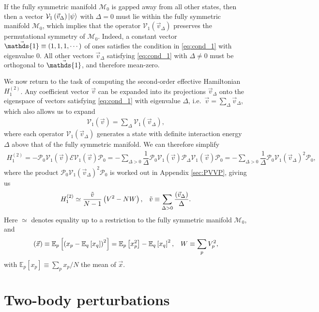 \documentclass[nofootinbib,notitlepage,11pt]{revtex4-2}
\newcommand{\f}[2]{\dfrac{#1}{#2}} %
\newcommand{\p}[1]{\left(#1\right)} %
\renewcommand{\sp}[1]{\left[#1\right]} %
\renewcommand{\v}{\vec} %
\newcommand{\1}{\mathds{1}}
\newcommand{\E}{\mathcal{E}}
\newcommand{\M}{\mathcal{M}}
\renewcommand{\P}{\mathcal{P}}
\newcommand{\V}{\mathcal{V}}
\newcommand{\EE}{\mathbb{E}}
\let\var\relax
\DeclareMathOperator{\var}{var}
\begin{document}
If the fully symmetric manifold $\M_0$ is gapped away from all other
states, then then a vector $\V_1\p{\v v_\Delta}\ket\psi$ with
$\Delta=0$ must lie within the fully symmetric manifold $\M_0$, which
implies that the operator $\V_1\p{\v v_\Delta}$ preserves the
permutational symmetry of $\M_0$.  Indeed, a constant vector
$\v\1\equiv\p{1,1,1,\cdots}$ of ones satisfies the condition in
\eqref{eq:cond_1} with eigenvalue $0$.  All other vectors
$\v v_\Delta$ satisfying \eqref{eq:cond_1} with $\Delta\ne0$ must be
orthogonal to $\v\1$, and therefore mean-zero.

We now return to the task of computing the second-order effective
Hamiltonian $H_1^{(2)}$.  Any coefficient vector $\v v$ can be
expanded into its projections $\v v_\Delta$ onto the eigenspace of
vectors satisfying \eqref{eq:cond_1} with eigenvalue $\Delta$,
i.e.~$\v v = \sum_\Delta \v v_\Delta$, which also allows us to expand
\begin{align}
  \V_1\p{\v v} = \sum_\Delta \V_1\p{\v v_\Delta},
\end{align}
where each operator $\V_1\p{\v v_\Delta}$ generates a state with
definite interaction energy $\Delta$ above that of the fully symmetric
manifold.  We can therefore simplify
\begin{align}
  H_1^{(2)}
  = -\P_0 \V_1\p{\v v} \E \V_1\p{\v v} \P_0
  = - \sum_{\Delta>0} \f1{\Delta}
  \P_0 \V_1\p{\v v} \P_\Delta \V_1\p{\v v} \P_0
  = - \sum_{\Delta>0} \f1{\Delta} \P_0 \V_1\p{\v v_\Delta}^2 \P_0,
\end{align}
where the product $\P_0 \V_1\p{\v v_\Delta}^2 \P_0$ is worked out in
Appendix \ref{sec:PVVP}, giving us
\begin{align}
  H_1^{(2)} \simeq \f{\tilde v}{N-1} \p{V^2 - N W},
  &&
  \tilde v \equiv \sum_{\Delta>0} \f{\var\p{\v v_\Delta}}{\Delta}.
  \label{eq:H_1_2}
\end{align}
Here $\simeq$ denotes equality up to a restriction to the fully
symmetric manifold $\M_0$, and
\begin{align}
  \var\p{\v x} \equiv \EE_p\sp{\p{x_p-\EE_q\sp{x_q}}^2}
  = \EE_p\sp{x_p^2} - \EE_q\sp{x_q}^2,
  &&
  W \equiv \sum_p V_p^2,
\end{align}
with $\EE_p\sp{x_p}\equiv\sum_px_p/N$ the mean of $\v x$.

\section{Two-body perturbations}
\end{document}
